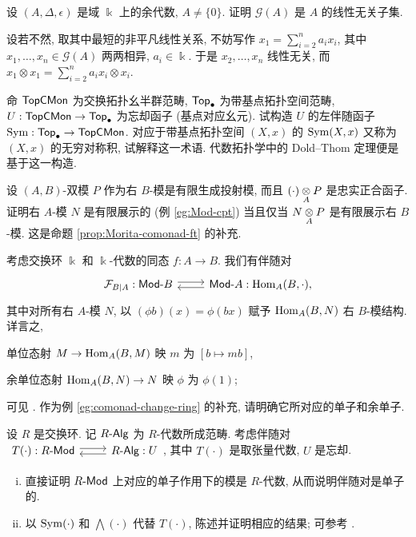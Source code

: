 \begin{Exercises}
	\item 设 $(A, \Delta, \epsilon)$ 是域 $\Bbbk$ 上的余代数, $A \neq \{0\}$. 证明 $\mathcal{G}(A)$ 是 $A$ 的线性无关子集.
	
	\begin{hint}
		设若不然, 取其中最短的非平凡线性关系, 不妨写作 $x_1 = \sum_{i=2}^n a_i x_i$, 其中 $x_1, \ldots, x_n \in \mathcal{G}(A)$ 两两相异, $a_i \in \Bbbk$. 于是 $x_2, \ldots, x_n$ 线性无关, 而 $x_1 \otimes x_1 = \sum_{i=2}^n a_i x_i \otimes x_i$.
	\end{hint}

	\item 命 $\mathsf{TopCMon}$ 为交换拓扑幺半群范畴, $\mathsf{Top}_\bullet$ 为带基点拓扑空间范畴, $U: \mathsf{TopCMon} \to \mathsf{Top}_\bullet$ 为忘却函子 (基点对应幺元). 试构造 $U$ 的左伴随函子 $\operatorname{Sym}: \mathsf{Top}_\bullet \to \mathsf{TopCMon}$. 对应于带基点拓扑空间 $(X, x)$ 的 $\operatorname{Sym}(X, x)$ 又称为 $(X, x)$ 的无穷对称积, 试解释这一术语. 代数拓扑学中的 Dold--Thom 定理便是基于这一构造.
	
	\item 设 $(A, B)$-双模 $P$ 作为右 $B$-模是有限生成投射模, 而且 $(\cdot) \underset{A}{\otimes} P$ 是忠实正合函子. 证明右 $A$-模 $N$ 是有限展示的 (例 \ref{eg:Mod-cpt}) 当且仅当 $N \underset{A}{\otimes} P$ 是有限展示右 $B$-模. 这是命题 \ref{prop:Morita-comonad-ft} 的补充.
	
	\item 考虑交换环 $\Bbbk$ 和 $\Bbbk$-代数的同态 $f: A \to B$. 我们有伴随对
	\[\begin{tikzcd}
		\mathcal{F}_{B|A}: \cated{Mod}B \arrow[shift left, r] & \cated{Mod}A: \Hom_A(B, \cdot), \arrow[shift left, l]
	\end{tikzcd}\]
	其中对所有右 $A$-模 $N$, 以 $(\phi b)(x) = \phi(bx)$ 赋予 $\operatorname{Hom}_A(B, N)$ 右 $B$-模结构. 详言之,
	\begin{compactitem}
		\item 单位态射 $M \to \operatorname{Hom}_A(B, M)$ 映 $m$ 为 $[b \mapsto mb]$,
		\item 余单位态射 $\operatorname{Hom}_A(B, N) \to N$ 映 $\phi$ 为 $\phi(1)$;
	\end{compactitem}
	可见 \cite[推论 6.6.8]{Li1}. 作为例 \ref{eg:comonad-change-ring} 的补充, 请明确它所对应的单子和余单子.

	\item 设 $R$ 是交换环. 记 $R\text{-}\mathsf{Alg}$ 为 $R$-代数所成范畴. 考虑伴随对
	$\begin{tikzcd}
		T(\cdot): R\dcate{Mod} \arrow[shift left, r] & R\dcate{Alg}: U \arrow[shift left, l]
	\end{tikzcd}$,
	其中 $T(\cdot)$ 是取张量代数, $U$ 是忘却.
	\begin{enumerate}[(i)]
		\item 直接证明 $R\text{-}\mathsf{Mod}$ 上对应的单子作用下的模是 $R$-代数, 从而说明伴随对是单子的.
		\item 以 $\operatorname{Sym}(\cdot)$ 和 $\bigwedge(\cdot)$ 代替 $T(\cdot)$, 陈述并证明相应的结果; 可参考 \cite[\S 7.6]{Li1}.
	\end{enumerate}


\end{Exercises}

